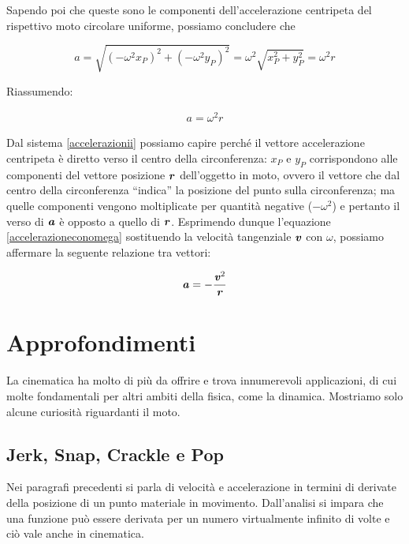 \noindent Sapendo poi che queste sono le componenti dell'accelerazione
centripeta del rispettivo moto circolare uniforme, possiamo concludere
che

\[ a = \sqrt{(-\omega^2 x_P)^2 + (-\omega^2 y_P)^2} = \omega^2 \sqrt{x_P^2 + y_P^2} = \omega^2 r \]

\noindent Riassumendo:

\begin{align}
    a = \omega^2 r\label{accelerazioneconomega}
\end{align}

Dal sistema \ref{accelerazionii} possiamo capire perché il vettore
accelerazione centripeta è diretto verso il centro della circonferenza:
$x_P$ e $y_P$ corrispondono alle componenti del vettore posizione $\textbf{\textit{r}}$
dell'oggetto in moto, ovvero il vettore che dal centro della circonferenza
``indica'' la posizione del punto sulla circonferenza; ma quelle componenti
vengono moltiplicate per quantità negative ($-\omega^2$) e pertanto
il verso di $\textbf{\textit{a}}$ è opposto a quello di $\textbf{\textit{r}}$.
Esprimendo dunque l'equazione \ref{accelerazioneconomega} sostituendo
la velocità tangenziale $\textbf{\textit{v}}$ con $\omega$, possiamo affermare
la seguente relazione tra vettori:

\begin{align}
    \textbf{\textit{a}} = -\frac{\textbf{\textit{v}}^2}{\textbf{\textit{r}}}
\end{align}




\section{Approfondimenti}
La cinematica ha molto di più da offrire e trova innumerevoli applicazioni,
di cui molte fondamentali per altri ambiti della fisica, come la dinamica.
Mostriamo solo alcune curiosità riguardanti il moto.

\subsection{Jerk, Snap, Crackle e Pop}
Nei paragrafi precedenti si parla di velocità e accelerazione in termini
di derivate della posizione di un punto materiale in movimento. Dall'analisi
si impara che una funzione può essere derivata per un numero virtualmente
infinito di volte e ciò vale anche in cinematica.

